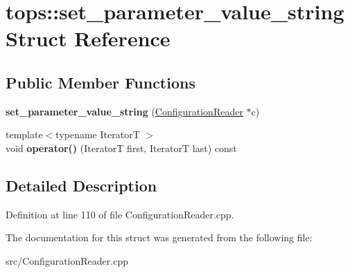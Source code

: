 \hypertarget{structtops_1_1set__parameter__value__string}{}\section{tops\+:\+:set\+\_\+parameter\+\_\+value\+\_\+string Struct Reference}
\label{structtops_1_1set__parameter__value__string}
\subsection*{Public Member Functions}
\begin{DoxyCompactItemize}
\item 
\mbox{\label{structtops_1_1set__parameter__value__string_aa45e5e38ad136fea8a11deeee9b31afb}} 
{\bfseries set\+\_\+parameter\+\_\+value\+\_\+string} (\hyperlink{classtops_1_1ConfigurationReader}{Configuration\+Reader} $\ast$c)
\item 
\mbox{\label{structtops_1_1set__parameter__value__string_aad8a778cad5814beb65fd3e8bf45d4e0}} 
{\footnotesize template$<$typename IteratorT $>$ }\\void {\bfseries operator()} (IteratorT first, IteratorT last) const
\end{DoxyCompactItemize}


\subsection{Detailed Description}


Definition at line 110 of file Configuration\+Reader.\+cpp.



The documentation for this struct was generated from the following file\+:\begin{DoxyCompactItemize}
\item 
src/Configuration\+Reader.\+cpp\end{DoxyCompactItemize}
